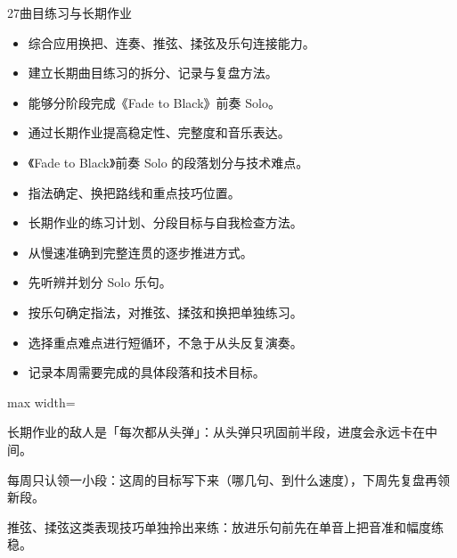 \begin{lessoncard}{27}{曲目练习与长期作业}
\begin{itemize}
\item 综合应用换把、连奏、推弦、揉弦及乐句连接能力。
\item 建立长期曲目练习的拆分、记录与复盘方法。
\item 能够分阶段完成《Fade to Black》前奏 Solo。
\item 通过长期作业提高稳定性、完整度和音乐表达。
\end{itemize}
\begin{itemize}
\item 《Fade to Black》前奏 Solo 的段落划分与技术难点。
\item 指法确定、换把路线和重点技巧位置。
\item 长期作业的练习计划、分段目标与自我检查方法。
\item 从慢速准确到完整连贯的逐步推进方式。
\end{itemize}
\begin{itemize}
\item 先听辨并划分 Solo 乐句。
\item 按乐句确定指法，对推弦、揉弦和换把单独练习。
\item 选择重点难点进行短循环，不急于从头反复演奏。
\item 记录本周需要完成的具体段落和技术目标。
\end{itemize}
\begin{fignote}
\begin{center}
\begin{adjustbox}{max width=\textwidth}
\steparrow
{}\steparrow
{}\steparrow
{}\steparrow
{}
\end{adjustbox}
\end{center}
\begin{fignotes}
\item 长期作业的敌人是「每次都从头弹」：从头弹只巩固前半段，进度会永远卡在中间。
\item 每周只认领一小段：这周的目标写下来（哪几句、到什么速度），下周先复盘再领新段。
\item 推弦、揉弦这类表现技巧单独拎出来练：放进乐句前先在单音上把音准和幅度练稳。
\end{fignotes}
\end{fignote}
\end{lessoncard}

